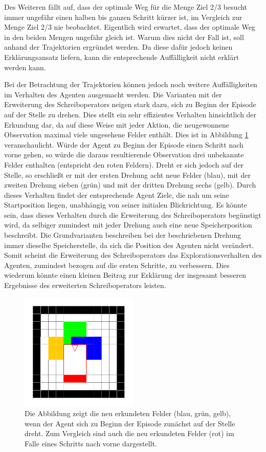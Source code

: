 Des Weiteren fällt auf, dass der optimale Weg für die Menge \glqq Ziel 2/3 besucht\grqq{} immer ungefähr einen halben bis ganzen Schritt kürzer ist, im Vergleich zur Menge \glqq Ziel 2/3 nie beobachtet\grqq{}. Eigentlich wird erwartet, dass der optimale Weg in den beiden Mengen ungefähr gleich ist. Warum dies nicht der Fall ist, soll anhand der Trajektorien ergründet werden. Da diese dafür jedoch keinen Erklärungsansatz liefern, kann die entsprechende Auffälligkeit nicht erklärt werden kann.

Bei der Betrachtung der Trajektorien können jedoch noch weitere Auffälligkeiten im Verhalten des Agenten ausgemacht werden. Die Varianten mit der Erweiterung des Schreiboperators neigen stark dazu, sich zu Beginn der Episode auf der Stelle zu drehen. Dies stellt ein sehr effizientes Verhalten hinsichtlich der Erkundung dar, da auf diese Weise mit jeder Aktion, die neugewonnene Observation maximal viele ungesehene Felder enthält. Dies ist in Abbildung \ref{sample_init_turn} veranschaulicht. Würde der Agent zu Beginn der Episode einen Schritt nach vorne gehen, so würde die daraus resultierende Observation drei unbekannte Felder enthalten (entspricht den roten Feldern). Dreht er sich jedoch auf der Stelle, so erschließt er mit der ersten Drehung acht neue Felder (blau), mit der zweiten Drehung sieben (grün) und mit der dritten Drehung sechs (gelb). Durch dieses Verhalten findet der entsprechende Agent Ziele, die nah um seine Startposition liegen, unabhängig von seiner initialen Blickrichtung. Es könnte sein, dass dieses Verhalten durch die Erweiterung des Schreiboperators begünstigt wird, da selbiger zumindest mit jeder Drehung auch eine neue Speicherposition beschreibt. Die Grundvarianten beschreiben bei der beschriebenen Drehung immer dieselbe Speicherstelle, da sich die Position des Agenten nicht verändert. Somit scheint die Erweiterung des Schreiboperators das Explorationsverhalten des Agenten, zumindest bezogen auf die ersten Schritte, zu verbessern. Dies wiederum könnte einen kleinen Beitrag zur Erklärung der insgesamt besseren Ergebnisse des erweiterten Schreiboperators leisten.

\begin{figure}[ht!]
	\centering
	\includegraphics[keepaspectratio,width=0.5\textwidth]{abbildungen/sample_init_turn.pdf}
	\caption{Die Abbildung zeigt die neu erkundeten Felder (blau, grün, gelb), wenn der Agent sich zu Beginn der Episode zunächst auf der Stelle dreht. Zum Vergleich sind auch die neu erkundeten Felder (rot) im Falle eines Schritts nach vorne dargestellt.}
	\label{sample_init_turn}
\end{figure}

